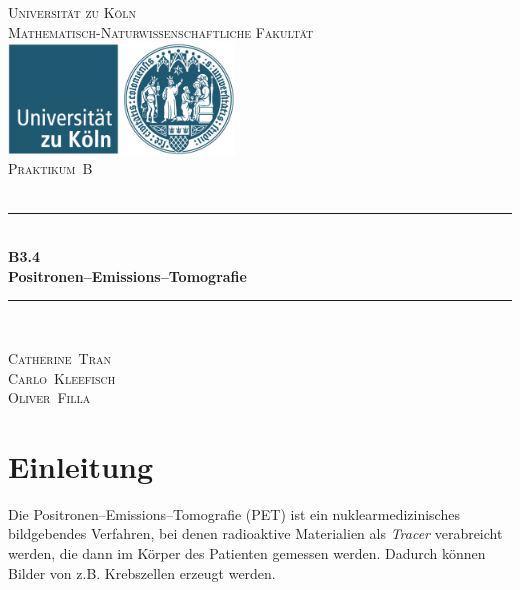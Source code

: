 \documentclass[12pt,a4paper]{scrartcl}
\numberwithin{equation}{section} %
\newcommand{\HRule}{\rule{\linewidth}{0.7mm}}
\begin{document}
\begin{titlepage}
	\pagestyle{empty}

	\begin{center}

	\textsc{\LARGE Universität zu Köln }\\ [0.4cm]
	\textsc{Mathematisch-Naturwissenschaftliche Fakultät} \\[1.5cm]

	\includegraphics[width=0.45\textwidth]{../media/uni.jpg}\\[1.5cm]  %

	\textsc{\Large Praktikum~B}\\[2mm]
	\textsc{}\\[10mm]
	\HRule \\[0.4cm]

		{	\Huge \bfseries B3.4}\\[0.4cm]
			{	\huge \bfseries Positronen--Emissions--Tomografie}\\[0.3cm]
	
	\HRule \\[3cm]

 	\begin{center}
		\textsc{\Large Catherine~Tran } \\[3pt]
		\textsc{\Large Carlo~Kleefisch } \\[3pt]
		\textsc{\Large Oliver~Filla } \\[3pt]
	\end{center}
	\end{center}
\end{titlepage}

\newpage
\tableofcontents
\newpage

\hypertarget{einleitung}{%
\section{Einleitung}\label{einleitung}}

Die Positronen--Emissions--Tomografie (PET) ist ein nuklearmedizinisches
bildgebendes Verfahren, bei denen radioaktive Materialien als
\emph{Tracer} verabreicht werden, die dann im Körper des Patienten
gemessen werden. Dadurch können Bilder von z.B. Krebszellen erzeugt
werden.
\end{document}
